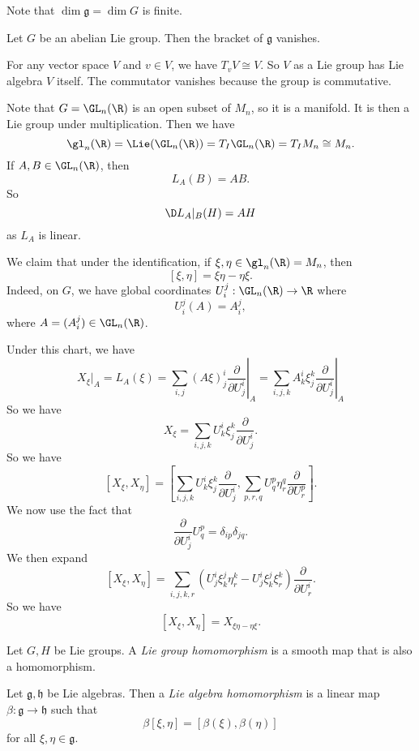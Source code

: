 \documentclass[a4paper]{article}
\begin{document}
Note that $\dim \mathfrak{g} = \dim G$ is finite.

\begin{lemma}
  Let $G$ be an abelian Lie group. Then the bracket of $\mathfrak{g}$ vanishes.
\end{lemma}

\begin{eg}
  For any vector space $V$ and $v \in V$, we have $T_v V \cong V$. So $V$ as a Lie group has Lie algebra $V$ itself. The commutator vanishes because the group is commutative.
\end{eg}

\begin{eg}
  Note that $G = \GL_n(\R)$ is an open subset of $M_n$, so it is a manifold. It is then a Lie group under multiplication. Then we have
  \[
    \gl_n(\R) = \Lie(\GL_n(\R)) = T_I \GL_n(\R) = T_I M_n \cong M_n.
  \]
  If $A, B \in \GL_n(\R)$, then
  \[
    L_A(B) = AB.
  \]
  So
  \[
    \D L_A|_B(H) = AH
  \]
  as $L_A$ is linear.

  We claim that under the identification, if $\xi, \eta \in \gl_n(\R) = M_n$, then
  \[
    [\xi, \eta] = \xi \eta - \eta \xi.
  \]
  Indeed, on $G$, we have global coordinates $U_i^j: \GL_n(\R) \to \R$ where
  \[
    U_i^j(A) = A_i^j,
  \]
  where $A = (A_i^j) \in \GL_n(\R)$.

  Under this chart, we have
  \[
    X_\xi|_A = L_A(\xi) = \sum_{i,j} (A \xi)_j^i \left.\frac{\partial}{\partial U_j^i}\right|_A = \sum_{i,j,k} A_k^i \xi_j^k \left.\frac{\partial}{\partial U_j^i} \right|_A
  \]
  So we have
  \[
    X_\xi = \sum_{i,j,k} U^i_k \xi^k_j \frac{\partial}{\partial U_j^i}.
  \]
  So we have
  \[
    [X_\xi, X_\eta] = \left[\sum_{i,j,k} U_k^i \xi_j^k \frac{\partial}{\partial U_j^i},\sum_{p, r, q} U_q^p \eta_r^q \frac{\partial}{\partial U_r^p}\right].
  \]
  We now use the fact that
  \[
    \frac{\partial}{\partial U^i_j} U^p_q = \delta_{ip}\delta_{jq}.
  \]
  We then expand
  \[
    [X_\xi, X_\eta] = \sum_{i,j,k,r} (U_j^i \xi_k^j \eta^k_r - U^i_j \xi^j_k \xi^k_r) \frac{\partial}{\partial U_r^i}.
  \]
  So we have
  \[
    [X_\xi, X_\eta] = X_{\xi\eta - \eta\xi}.
  \]
\end{eg}

\begin{defi}
  Let $G, H$ be Lie groups. A \emph{Lie group homomorphism} is a smooth map that is also a homomorphism.
\end{defi}

\begin{defi}
  Let $\mathfrak{g}, \mathfrak{h}$ be Lie algebras. Then a \emph{Lie algebra homomorphism} is a linear map $\beta: \mathfrak{g} \to \mathfrak{h}$ such that
  \[
    \beta[\xi,\eta] = [\beta(\xi), \beta(\eta)]
  \]
  for all $\xi,\eta \in \mathfrak{g}$.
\end{defi}
\end{document}
